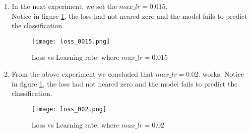 \begin{enumerate}
    \item In the next experiment, we set the $max\_lr = 0.015$. \\
    Notice in figure \ref{fig:Loss value at 0.015}, the loss had not neared zero and the model fails to predict the classification. 
    \begin{figure}[H]
        \centering    
        \texttt{[image: loss\_0015.png]}
        \caption{Loss vs Learning rate; where $max\_lr = 0.015$}
        \label{fig:Loss value at 0.015}
    \end{figure}

    \item From the above experiment  we concluded that  $max\_lr = 0.02$. works.
    Notice in figure \ref{fig:Loss value at 0.015}, the loss had not neared zero and the model fails to predict the classification. 
    \begin{figure}[H]
        \centering    
        \texttt{[image: loss\_002.png]}
        \caption{Loss vs Learning rate; where $max\_lr = 0.02$}
        \label{fig:Loss value at 0.02}
    \end{figure}
    

\end{enumerate}